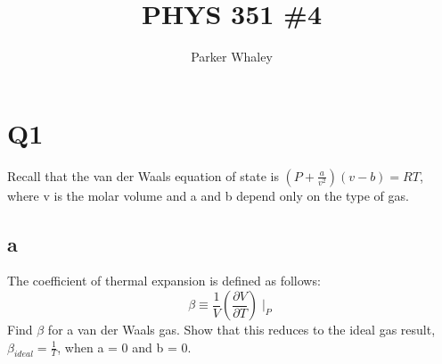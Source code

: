 \documentclass[10pt,a4paper]{article}
\author{Parker Whaley}
\title{PHYS 351 \#4}
\begin{document}
\maketitle

\section{Q1}
Recall that the van der Waals equation of state is $(P +\frac{a}{v^2} )(v - b) = RT$, where v is
the molar volume and a and b depend only on the type of gas.
\subsection{a}
The coefficient of thermal expansion is defined as follows:
\[\beta \equiv \frac{1}{V}(\frac{\partial V}{\partial T})\mid_P\]
Find $\beta$ for a van der Waals gas. Show that this reduces to the ideal gas result, $\beta_{ideal} =\frac{1}{T}$, when a = 0 and b = 0.
\end{document}
